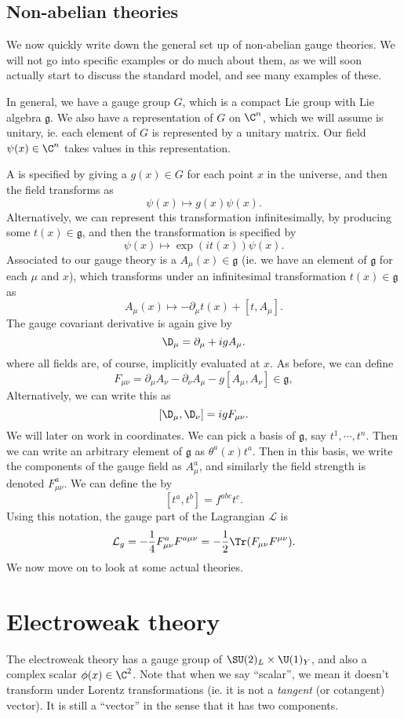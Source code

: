 \documentclass[a4paper]{article}
\begin{document}
\subsection{Non-abelian theories}
We now quickly write down the general set up of non-abelian gauge theories. We will not go into specific examples or do much about them, as we will soon actually start to discuss the standard model, and see many examples of these.

In general, we have a gauge group $G$, which is a compact Lie group with Lie algebra $\mathfrak{g}$. We also have a representation of $G$ on $\C^n$, which we will assume is unitary, ie. each element of $G$ is represented by a unitary matrix. Our field $\psi(x) \in \C^n$ takes values in this representation.

A  is specified by giving a $g(x) \in G$ for each point $x$ in the universe, and then the field transforms as
\[
  \psi(x) \mapsto g(x) \psi(x).
\]
Alternatively, we can represent this transformation infinitesimally, by producing some $t(x) \in \mathfrak{g}$, and then the transformation is specified by
\[
  \psi(x) \mapsto \exp(i t(x)) \psi(x).
\]
Associated to our gauge theory is a  $A_\mu(x) \in \mathfrak{g}$ (ie. we have an element of $\mathfrak{g}$ for each $\mu$ and $x$), which transforms under an infinitesimal transformation $t(x) \in \mathfrak{g}$ as
\[
  A_\mu(x) \mapsto - \partial_\mu t(x) + [t, A_\mu].
\]
The gauge covariant derivative is again give by
\[
  \D_\mu = \partial_\mu + i g A_\mu.
\]
where all fields are, of course, implicitly evaluated at $x$. As before, we can define
\[
  F_{\mu\nu} = \partial_\mu A_\nu - \partial_\nu A_\mu - g [A_\mu, A_\nu] \in \mathfrak{g},
\]
Alternatively, we can write this as
\[
  [\D_\mu, \D_\nu] = ig F_{\mu\nu}.
\]
We will later on work in coordinates. We can pick a basis of $\mathfrak{g}$, say $t^1, \cdots, t^n$. Then we can write an arbitrary element of $\mathfrak{g}$ as $\theta^a(x) t^a$. Then in this basis, we write the components of the gauge field as $A_\mu^a$, and similarly the field strength is denoted $F_{\mu\nu}^a$. We can define the   by
\[
  [t^a, t^b] = f^{abc}t^c.
\]
Using this notation, the gauge part of the Lagrangian $\mathcal{L}$ is
\[
  \mathcal{L}_g = -\frac{1}{4} F_{\mu\nu}^a F^{a\mu\nu} = - \frac{1}{2} \Tr (F_{\mu\nu} F^{\mu\nu}). %
\]
We now move on to look at some actual theories.

\section{Electroweak theory}
The electroweak theory has a gauge group of $\SU(2)_L \times \U(1)_Y$, and also a complex scalar  $\phi(x) \in \C^2$. Note that when we say ``scalar'', we mean it doesn't transform under Lorentz transformations (ie. it is not a \emph{tangent} (or cotangent) vector). It is still a ``vector'' in the sense that it has two components.
\end{document}
